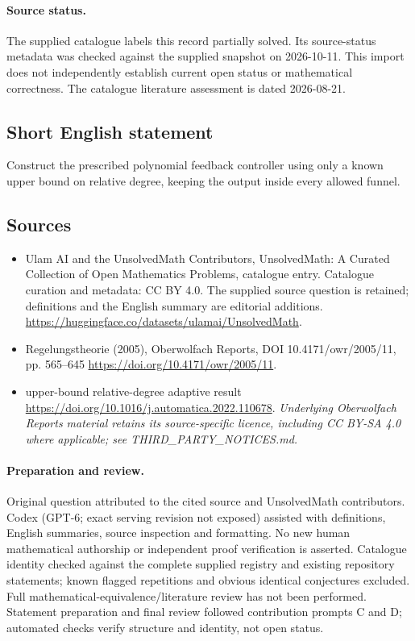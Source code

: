 \documentclass[11pt]{article}
\begin{document}
\paragraph{Source status.}
The supplied catalogue labels this record partially solved. Its source-status metadata was checked against the supplied snapshot on 2026-10-11. This import does not independently establish current open status or mathematical correctness. The catalogue literature assessment is dated 2026-08-21.
\subsection{Short English statement}
Construct the prescribed polynomial feedback controller using only a known upper bound on relative degree, keeping the output inside every allowed funnel.
\subsection{Sources}
\begin{itemize}
\item[\hypertarget{source:statement:1}{S1}] Ulam AI and the UnsolvedMath Contributors, UnsolvedMath: A Curated Collection of Open Mathematics Problems, catalogue entry. Catalogue curation and metadata: CC BY 4.0. The supplied source question is retained; definitions and the English summary are editorial additions.
\url{https://huggingface.co/datasets/ulamai/UnsolvedMath}.
\item[\hypertarget{source:statement:2}{S2}] Regelungstheorie (2005), Oberwolfach Reports, DOI 10.4171/owr/2005/11, pp. 565--645
\url{https://doi.org/10.4171/owr/2005/11}.
\item[\hypertarget{source:statement:3}{S3}] upper-bound relative-degree adaptive result
\url{https://doi.org/10.1016/j.automatica.2022.110678}.
\textit{Underlying Oberwolfach Reports material retains its source-specific licence, including CC BY-SA 4.0 where applicable; see THIRD\_PARTY\_NOTICES.md.}
\end{itemize}
\paragraph{Preparation and review.}
Original question attributed to the cited source and UnsolvedMath contributors. Codex (GPT-6; exact serving revision not exposed) assisted with definitions, English summaries, source inspection and formatting. No new human mathematical authorship or independent proof verification is asserted. Catalogue identity checked against the complete supplied registry and existing repository statements; known flagged repetitions and obvious identical conjectures excluded. Full mathematical-equivalence/literature review has not been performed. Statement preparation and final review followed contribution prompts C and D; automated checks verify structure and identity, not open status.
\label{end:statement}
\end{document}
